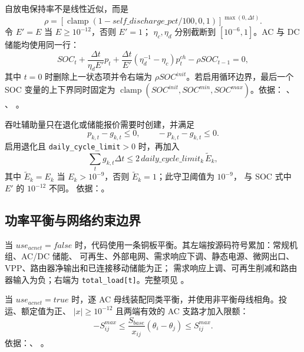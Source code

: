 自放电保持率不是线性近似，而是
\begin{equation}
 \rho=\left[\operatorname{clamp}(1-self\_discharge\_pct/100,0,1)\right]^
 {\max(0,\Delta t)}.
\end{equation}
令 $E'=E$ 当 $E\ge10^{-12}$，否则 $E'=1$；
$\eta_c,\eta_d$ 分别截断到 $[10^{-6},1]$。AC 与 DC 储能均使用同一行：
\begin{equation}
 SOC_t+\frac{\Delta t}{\eta_dE'}p_t+
 \frac{\Delta t}{E'}(\eta_d^{-1}-\eta_c)p_t^{ch}
 -\rho SOC_{t-1}=0,
\end{equation}
其中 $t=0$ 时删除上一状态项并令右端为 $\rho SOC^{init}$。若启用循环边界，最后一个
SOC 变量的上下界同时固定为
$\operatorname{clamp}(SOC^{init},SOC^{min},SOC^{max})$。依据：
、
、
。

吞吐辅助量只在退化或储能报价需要时创建，并满足
\begin{equation}
 p_{k,t}-g_{k,t}\le0,\qquad-p_{k,t}-g_{k,t}\le0.
\end{equation}
启用退化且 \texttt{daily\_cycle\_limit}$>0$ 时，再加入
\begin{equation}
 \sum_tg_{k,t}\Delta t\le2\,daily\_cycle\_limit_k\,\tilde E_k,
\end{equation}
其中 $\tilde E_k=E_k$ 当 $E_k>10^{-9}$，否则 $\tilde E_k=1$；此守卫阈值为 $10^{-9}$，
与 SOC 式中 $E'$ 的 $10^{-12}$ 不同。
依据：。

\subsection{功率平衡与网络约束边界}
当 $use_{acnet}=false$ 时，代码使用一条铜板平衡。其左端按源码符号累加：常规机组、AC/DC 储能、
可再生、外部电网、需求响应下调、静态电源、微网出口、VPP、路由器净输出和已连接移动储能为正；
需求响应上调、可再生削减和路由器输入为负；右端为 \texttt{total\_load[t]}。完整项见
。

当 $use_{acnet}=true$ 时，逐 AC 母线装配同类平衡，并使用非平衡母线相角。投运、额定值为正、
$|x|\ge10^{-12}$ 且两端有效的 AC 支路才加入限额：
\begin{equation}
 -S_{ij}^{max}\le\frac{S_{base}}{x_{ij}}(\theta_i-\theta_j)
 \le S_{ij}^{max}.
\end{equation}
依据：、
。

